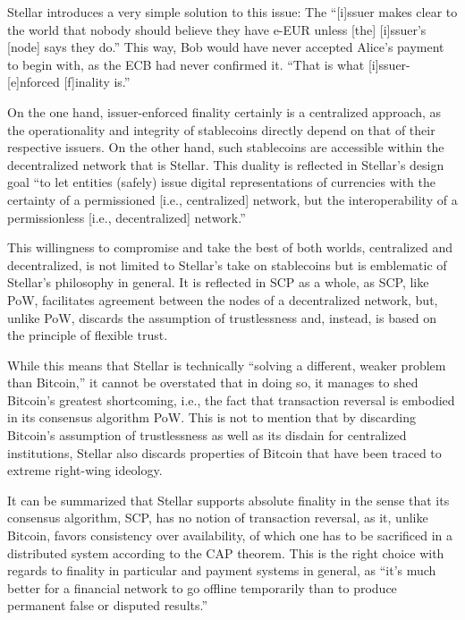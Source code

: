 Stellar introduces a very simple solution to this issue:
The ``[i]ssuer makes clear to the world that nobody should believe they have e-EUR unless [the] [i]ssuer's [node] says they do.'' \autocite{stellar2020ief}
This way, Bob would have never accepted Alice's payment to begin with, as the ECB had never confirmed it.
``That is what [i]ssuer-[e]nforced [f]inality is.'' \autocite{stellar2020ief}

On the one hand, issuer-enforced finality certainly is a centralized approach, as the operationality and integrity of stablecoins directly depend on that of their respective issuers.
On the other hand, such stablecoins are accessible within the decentralized network that is Stellar.
This duality is reflected in Stellar's design goal ``to let entities (safely) issue digital representations of currencies with the certainty of a permissioned [i.e., centralized] network, but the interoperability of a permissionless [i.e., decentralized] network.'' \autocite{stellar2020ief}

This willingness to compromise and take the best of both worlds, centralized and decentralized, is not limited to Stellar's take on stablecoins but is emblematic of Stellar's philosophy in general.
It is reflected in SCP as a whole, as SCP, like PoW, facilitates agreement between the nodes of a decentralized network, but, unlike PoW, discards the assumption of trustlessness and, instead, is based on the principle of flexible trust.

While this means that Stellar is technically ``solving a different, weaker problem than Bitcoin,'' \autocite{hackernoon2018cryptocurrencyfinality} it cannot be overstated that in doing so, it manages to shed Bitcoin's greatest shortcoming, i.e., the fact that transaction reversal is embodied in its consensus algorithm PoW.
This is not to mention that by discarding Bitcoin's assumption of trustlessness as well as its disdain for centralized institutions, Stellar also discards properties of Bitcoin that have been traced to extreme right-wing ideology.

It can be summarized that Stellar supports absolute finality in the sense that its consensus algorithm, SCP, has no notion of transaction reversal, as it, unlike Bitcoin, favors consistency over availability, of which one has to be sacrificed in a distributed system according to the CAP theorem.
This is the right choice with regards to finality in particular and payment systems in general, as ``it’s much better for a financial network to go offline temporarily than to produce permanent false or disputed results.'' \autocite{stellar2019networkhalt}


